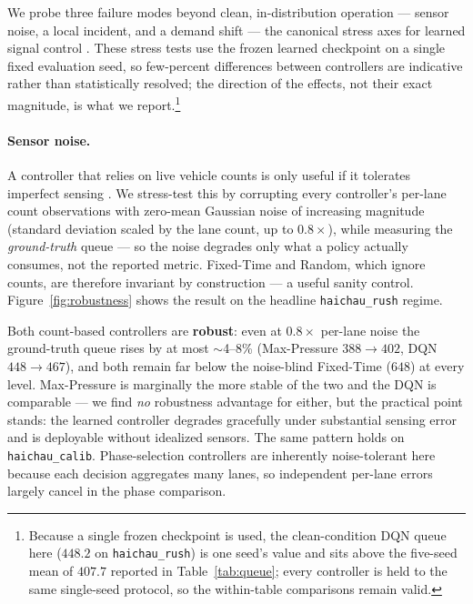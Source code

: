 We probe three failure modes beyond clean, in-distribution operation --- sensor noise,
a local incident, and a demand shift --- the canonical stress axes for learned signal
control \cite{Rodrigues_2019,Nguyen_TREX_2025}. These stress tests use the frozen learned
checkpoint on a single fixed evaluation seed, so few-percent differences between controllers
are indicative rather than statistically resolved; the direction of the effects, not their
exact magnitude, is what we report.\footnote{Because a single frozen checkpoint is used, the
clean-condition DQN queue here ($448.2$ on \texttt{haichau\_rush}) is one seed's value and sits
above the five-seed mean of $407.7$ reported in Table~\ref{tab:queue}; every controller is held
to the same single-seed protocol, so the within-table comparisons remain valid.}

\paragraph{Sensor noise.}

A controller that relies on live vehicle counts is only useful if it tolerates imperfect
sensing \cite{RESCO_2021}. We stress-test this by corrupting every controller's per-lane count
observations with zero-mean Gaussian noise of increasing magnitude (standard deviation scaled by
the lane count, up to $0.8\times$), while measuring the \emph{ground-truth} queue --- so the
noise degrades only what a policy actually consumes, not the reported metric. Fixed-Time and
Random, which ignore counts, are therefore invariant by construction --- a useful sanity control.
Figure~\ref{fig:robustness} shows the result on the headline \texttt{haichau\_rush} regime.

Both count-based controllers are \textbf{robust}: even at $0.8\times$ per-lane noise the
ground-truth queue rises by at most $\sim$4--8\% (Max-Pressure $388\!\to\!402$, DQN
$448\!\to\!467$), and both remain far below the noise-blind Fixed-Time ($648$) at every level.
Max-Pressure is marginally the more stable of the two and the DQN is comparable --- we find
\emph{no} robustness advantage for either, but the practical point stands: the learned
controller degrades gracefully under substantial sensing error and is deployable without
idealized sensors. The same pattern holds on \texttt{haichau\_calib}. Phase-selection
controllers are inherently noise-tolerant here because each decision aggregates many lanes, so
independent per-lane errors largely cancel in the phase comparison.

